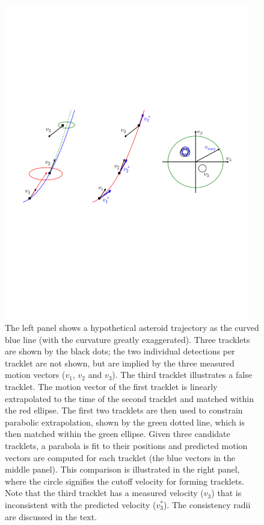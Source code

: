 \begin{figure}[th!]
\centering
\vskip -2.6in
\includegraphics[width=0.95\textwidth]{figures/TrackSlide1}
\vskip -2.7in
\caption{The left panel shows a hypothetical asteroid trajectory as the curved blue line (with 
the curvature greatly exaggerated). Three tracklets are shown by the black dots; the 
two individual detections per tracklet are not shown, but are implied by the three measured
motion vectors ($v_1$, $v_2$ and $v_3$). The third tracklet illustrates a false tracklet. 
The motion vector of the first tracklet is linearly extrapolated to the time of the second 
tracklet and matched within the red ellipse. The first two tracklets are then used to 
constrain parabolic extrapolation, shown by the green dotted line, which is then matched
within the green ellipse. Given three candidate tracklets, a parabola is fit to their positions
and predicted motion vectors are computed for each tracklet (the blue vectors in the middle
panel). This comparison is illustrated in the right panel, where the circle signifies the cutoff 
velocity for forming tracklets. Note that the third tracklet has a measured velocity ($v_3$)
that is inconsistent with the predicted velocity ($v_3^\ast$). The consistency radii are discussed 
in the text.
\label{fig:TrackSlide1}}
\end{figure}

